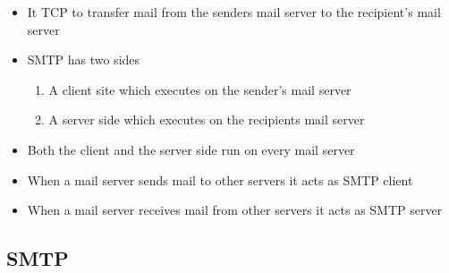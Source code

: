 \documentclass[11pt]{article}
\providecommand{\tightlist}{%
      \setlength{\itemsep}{0pt}\setlength{\parskip}{0pt}}
\begin{document}
\begin{itemize}
  \begin{itemize}
  \tightlist
  \item
    It TCP to transfer mail from the senders mail server to the
    recipient's mail server
  \item
    SMTP has two sides

    \begin{enumerate}
    \def\labelenumi{\arabic{enumi}.}
    \tightlist
    \item
      A client site which executes on the sender's mail server
    \item
      A server side which executes on the recipients mail server
    \end{enumerate}
  \item
    Both the client and the server side run on every mail server
  \item
    When a mail server sends mail to other servers it acts as SMTP
    client
  \item
    When a mail server receives mail from other servers it acts as SMTP
    server
  \end{itemize}
\end{itemize}

    \subsection{SMTP}\label{smtp}
\end{document}
